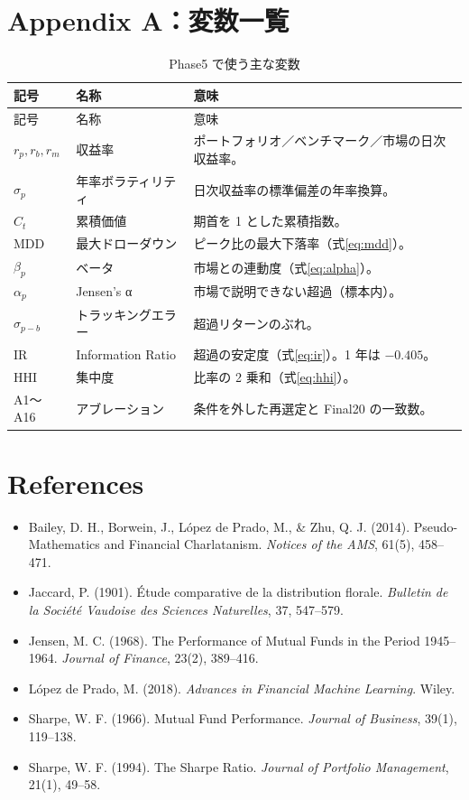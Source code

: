 \documentclass[a4paper,10pt]{article}
\newcommand{\metric}[1]{\mathrm{#1}}
\begin{document}
\section{Appendix A：変数一覧}
\begin{longtable}{p{26mm}p{44mm}p{74mm}}
\caption{Phase5 で使う主な変数}\\
\toprule
記号 & 名称 & 意味 \\
\midrule
\endfirsthead
\toprule
記号 & 名称 & 意味 \\
\midrule
\endhead
$r_p, r_b, r_m$ & 収益率 & ポートフォリオ／ベンチマーク／市場の日次収益率。 \\
$\sigma_p$ & 年率ボラティリティ & 日次収益率の標準偏差の年率換算。 \\
$C_t$ & 累積価値 & 期首を 1 とした累積指数。 \\
$\metric{MDD}$ & 最大ドローダウン & ピーク比の最大下落率（式\eqref{eq:mdd}）。 \\
$\beta_p$ & ベータ & 市場との連動度（式\eqref{eq:alpha}）。 \\
$\alpha_p$ & Jensen's α & 市場で説明できない超過（標本内）。 \\
$\sigma_{p-b}$ & トラッキングエラー & 超過リターンのぶれ。 \\
$\metric{IR}$ & Information Ratio & 超過の安定度（式\eqref{eq:ir}）。1 年は $-0.405$。 \\
$\metric{HHI}$ & 集中度 & 比率の 2 乗和（式\eqref{eq:hhi}）。 \\
A1〜A16 & アブレーション & 条件を外した再選定と Final20 の一致数。 \\
\bottomrule
\end{longtable}

\section{References}
\begin{itemize}
\item Bailey, D. H., Borwein, J., L\'opez de Prado, M., \& Zhu, Q. J. (2014). Pseudo-Mathematics and Financial Charlatanism. \emph{Notices of the AMS}, 61(5), 458--471.
\item Jaccard, P. (1901). \'Etude comparative de la distribution florale. \emph{Bulletin de la Soci\'et\'e Vaudoise des Sciences Naturelles}, 37, 547--579.
\item Jensen, M. C. (1968). The Performance of Mutual Funds in the Period 1945--1964. \emph{Journal of Finance}, 23(2), 389--416.
\item L\'opez de Prado, M. (2018). \emph{Advances in Financial Machine Learning}. Wiley.
\item Sharpe, W. F. (1966). Mutual Fund Performance. \emph{Journal of Business}, 39(1), 119--138.
\item Sharpe, W. F. (1994). The Sharpe Ratio. \emph{Journal of Portfolio Management}, 21(1), 49--58.
\end{itemize}
\end{document}

